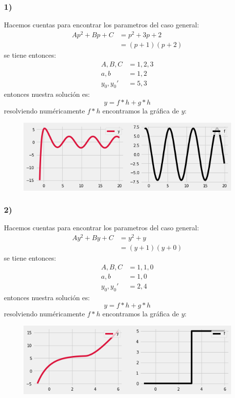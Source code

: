 \documentclass{article}
\begin{document}
\begin{tcolorbox}[breakable]
    \subsubsection*{1)}
    Hacemos cuentas para encontrar los parametros del caso general:
    \begin{align*}
        Ap^2 + Bp + C 
        &= p^2 + 3p + 2 \\
        &= (p+1)(p+2) 
    \end{align*}
    se tiene entonces:
    \begin{align*}
        A, B, C &= 1, 2, 3 \\ 
        a, b &= 1, 2 \\
        y_0, y_0' &= 5, 3
    \end{align*}
    entonces nuestra solución es:
    \[ y = f*h + g*h \]
    resolviendo numéricamente $f*h$ encontramos la gráfica de $y$:
    \begin{figure}[H]
        \centering
        \includegraphics[scale=0.7]{images/p1_1.png}
    \end{figure}

    \subsubsection*{2)}
    Hacemos cuentas para encontrar los parametros del caso general:
    \begin{align*}
        Ay^2 + By + C 
        &= y^2 + y \\
        &= (y+1)(y+0)
    \end{align*}
    se tiene entonces:
    \begin{align*}
        A, B, C &= 1,1,0 \\ 
        a,b &= 1,0 \\
        y_0, y_0' &= 2, 4
    \end{align*}
    entonces nuestra solución es:
    \[ y = f*h + g*h \]
    resolviendo numéricamente $f*h$ encontramos la gráfica de $y$:
    \begin{figure}[H]
        \centering
        \includegraphics[scale=0.7]{images/p1_2.png}
    \end{figure}

\end{tcolorbox}
\end{document}
